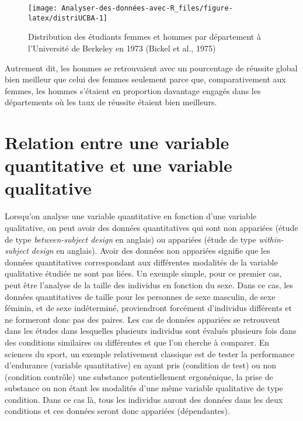 \documentclass[
  french,
]{book}
\begin{document}
\begin{figure}

{\centering \texttt{[image: Analyser-des-données-avec-R\_files/figure-latex/distriUCBA-1]} 

}

\caption{Distribution des étudiants femmes et hommes par département à l'Université de Berkeley en 1973 (Bickel et al., 1975)}\label{fig:distriUCBA}
\end{figure}

Autrement dit, les hommes se retrouvaient avec un pourcentage de réussite global bien meilleur que celui des femmes seulement parce que, comparativement aux femmes, les hommes s'étaient en proportion davantage engagés dans les départements où les taux de réussite étaient bien meilleurs.

\hypertarget{relation-entre-une-variable-quantitative-et-une-variable-qualitative}{%
\section{Relation entre une variable quantitative et une variable qualitative}\label{relation-entre-une-variable-quantitative-et-une-variable-qualitative}}

Lorsqu'on analyse une variable quantitative en fonction d'une variable qualitative, on peut avoir des données quantitatives qui sont non appariées (étude de type \emph{between-subject design} en anglais) ou appariées (étude de type \emph{within-subject design} en anglais). Avoir des données non appariées signifie que les données quantitatives correspondant aux différentes modalités de la variable qualitative étudiée ne sont pas liées. Un exemple simple, pour ce premier cas, peut être l'analyse de la taille des individus en fonction du sexe. Dans ce cas, les données quantitatives de taille pour les personnes de sexe masculin, de sexe féminin, et de sexe indéterminé, proviendront forcément d'individus différents et ne formeront donc pas des paires. Les cas de données appariées se retrouvent dans les études dans lesquelles plusieurs individus sont évalués plusieurs fois dans des conditions similaires ou différentes et que l'on cherche à comparer. En sciences du sport, un exemple relativement classique est de tester la performance d'endurance (variable quantitative) en ayant pris (condition de test) ou non (condition contrôle) une substance potentiellement ergonénique, la prise de substance ou non étant les modalités d'une même variable qualitative de type condition. Dans ce cas là, tous les individus auront des données dans les deux conditions et ces données seront donc appariées (dépendantes).
\end{document}
